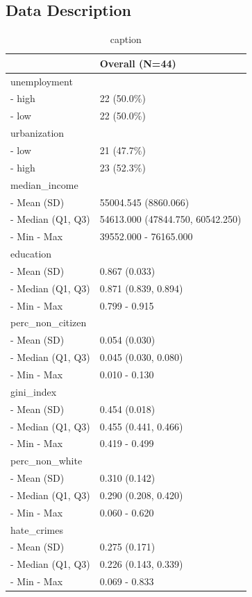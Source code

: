 \documentclass[
  english,
  man]{apa6}
\begin{document}
\hypertarget{data-description}{%
\subsection{Data Description}\label{data-description}}

\begin{longtable}[t]{l|l}
\caption{\label{tab:descriptive}caption}\\
\hline
 & Overall (N=44)\\
\hline
unemployment & \\
\hline
-  high & 22 (50.0\%)\\
\hline
-  low & 22 (50.0\%)\\
\hline
urbanization & \\
\hline
-  low & 21 (47.7\%)\\
\hline
-  high & 23 (52.3\%)\\
\hline
median\_income & \\
\hline
-  Mean (SD) & 55004.545 (8860.066)\\
\hline
-  Median (Q1, Q3) & 54613.000 (47844.750, 60542.250)\\
\hline
-  Min - Max & 39552.000 - 76165.000\\
\hline
education & \\
\hline
-  Mean (SD) & 0.867 (0.033)\\
\hline
-  Median (Q1, Q3) & 0.871 (0.839, 0.894)\\
\hline
-  Min - Max & 0.799 - 0.915\\
\hline
perc\_non\_citizen & \\
\hline
-  Mean (SD) & 0.054 (0.030)\\
\hline
-  Median (Q1, Q3) & 0.045 (0.030, 0.080)\\
\hline
-  Min - Max & 0.010 - 0.130\\
\hline
gini\_index & \\
\hline
-  Mean (SD) & 0.454 (0.018)\\
\hline
-  Median (Q1, Q3) & 0.455 (0.441, 0.466)\\
\hline
-  Min - Max & 0.419 - 0.499\\
\hline
perc\_non\_white & \\
\hline
-  Mean (SD) & 0.310 (0.142)\\
\hline
-  Median (Q1, Q3) & 0.290 (0.208, 0.420)\\
\hline
-  Min - Max & 0.060 - 0.620\\
\hline
hate\_crimes & \\
\hline
-  Mean (SD) & 0.275 (0.171)\\
\hline
-  Median (Q1, Q3) & 0.226 (0.143, 0.339)\\
\hline
-  Min - Max & 0.069 - 0.833\\
\hline
\end{longtable}
\end{document}
